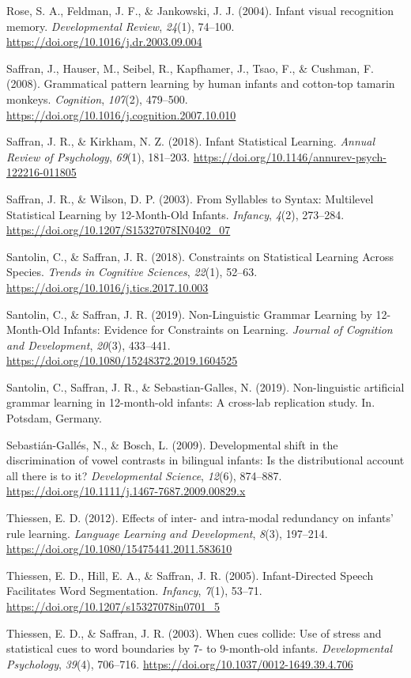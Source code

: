 \documentclass[english,man]{apa6}
\begin{document}
\leavevmode\hypertarget{ref-rose2004}{}%
Rose, S. A., Feldman, J. F., \& Jankowski, J. J. (2004). Infant visual recognition memory. \emph{Developmental Review}, \emph{24}(1), 74--100. \url{https://doi.org/10.1016/j.dr.2003.09.004}

\leavevmode\hypertarget{ref-saffran2008}{}%
Saffran, J., Hauser, M., Seibel, R., Kapfhamer, J., Tsao, F., \& Cushman, F. (2008). Grammatical pattern learning by human infants and cotton-top tamarin monkeys. \emph{Cognition}, \emph{107}(2), 479--500. \url{https://doi.org/10.1016/j.cognition.2007.10.010}

\leavevmode\hypertarget{ref-saffran2018}{}%
Saffran, J. R., \& Kirkham, N. Z. (2018). Infant Statistical Learning. \emph{Annual Review of Psychology}, \emph{69}(1), 181--203. \url{https://doi.org/10.1146/annurev-psych-122216-011805}

\leavevmode\hypertarget{ref-saffran2003}{}%
Saffran, J. R., \& Wilson, D. P. (2003). From Syllables to Syntax: Multilevel Statistical Learning by 12-Month-Old Infants. \emph{Infancy}, \emph{4}(2), 273--284. \url{https://doi.org/10.1207/S15327078IN0402_07}

\leavevmode\hypertarget{ref-santolin2018}{}%
Santolin, C., \& Saffran, J. R. (2018). Constraints on Statistical Learning Across Species. \emph{Trends in Cognitive Sciences}, \emph{22}(1), 52--63. \url{https://doi.org/10.1016/j.tics.2017.10.003}

\leavevmode\hypertarget{ref-santolin2019}{}%
Santolin, C., \& Saffran, J. R. (2019). Non-Linguistic Grammar Learning by 12-Month-Old Infants: Evidence for Constraints on Learning. \emph{Journal of Cognition and Development}, \emph{20}(3), 433--441. \url{https://doi.org/10.1080/15248372.2019.1604525}

\leavevmode\hypertarget{ref-santolin2019a}{}%
Santolin, C., Saffran, J. R., \& Sebastian-Galles, N. (2019). Non-linguistic artificial grammar learning in 12-month-old infants: A cross-lab replication study. In. Potsdam, Germany.

\leavevmode\hypertarget{ref-sebastian-galles2009}{}%
Sebastián-Gallés, N., \& Bosch, L. (2009). Developmental shift in the discrimination of vowel contrasts in bilingual infants: Is the distributional account all there is to it? \emph{Developmental Science}, \emph{12}(6), 874--887. \url{https://doi.org/10.1111/j.1467-7687.2009.00829.x}

\leavevmode\hypertarget{ref-thiessen2012}{}%
Thiessen, E. D. (2012). Effects of inter- and intra-modal redundancy on infants' rule learning. \emph{Language Learning and Development}, \emph{8}(3), 197--214. \url{https://doi.org/10.1080/15475441.2011.583610}

\leavevmode\hypertarget{ref-thiessen2005}{}%
Thiessen, E. D., Hill, E. A., \& Saffran, J. R. (2005). Infant-Directed Speech Facilitates Word Segmentation. \emph{Infancy}, \emph{7}(1), 53--71. \url{https://doi.org/10.1207/s15327078in0701_5}

\leavevmode\hypertarget{ref-thiessen2003}{}%
Thiessen, E. D., \& Saffran, J. R. (2003). When cues collide: Use of stress and statistical cues to word boundaries by 7- to 9-month-old infants. \emph{Developmental Psychology}, \emph{39}(4), 706--716. \url{https://doi.org/10.1037/0012-1649.39.4.706}

\endgroup
\end{document}
